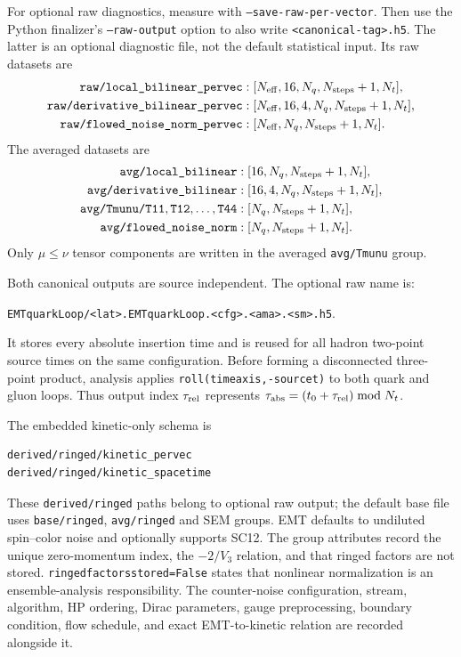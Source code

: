 \documentclass[11pt,a4paper]{article}
\newcommand{\code}[1]{\texttt{\begingroup\def\_{\textunderscore\allowbreak}#1\endgroup}}
\newcommand{\Vthree}{V_3}
\begin{document}
For optional raw diagnostics, measure with \code{--save-raw-per-vector}.
Then use the Python finalizer's \code{--raw-output} option to also write
\code{<canonical-tag>.h5}.
The latter is an optional diagnostic file, not the default statistical input.
Its raw datasets are
\begin{align}
  \code{raw/local\_bilinear\_pervec}
  &:
  [N_{\mathrm{eff}},16,N_q,N_{\mathrm{steps}}+1,N_t],
  \\
  \code{raw/derivative\_bilinear\_pervec}
  &:
  [N_{\mathrm{eff}},16,4,N_q,N_{\mathrm{steps}}+1,N_t],
  \\
  \code{raw/flowed\_noise\_norm\_pervec}
  &:
  [N_{\mathrm{eff}},N_q,N_{\mathrm{steps}}+1,N_t].
\end{align}
The averaged datasets are
\begin{align}
  \code{avg/local\_bilinear}
  &:[16,N_q,N_{\mathrm{steps}}+1,N_t],
  \\
  \code{avg/derivative\_bilinear}
  &:[16,4,N_q,N_{\mathrm{steps}}+1,N_t],
  \\
  \code{avg/Tmunu/T11},\code{T12},\ldots,\code{T44}
  &:
  [N_q,N_{\mathrm{steps}}+1,N_t],
  \\
  \code{avg/flowed\_noise\_norm}
  &:
  [N_q,N_{\mathrm{steps}}+1,N_t].
\end{align}
Only \(\mu\leq\nu\) tensor components are written in the averaged
\code{avg/Tmunu} group.

Both canonical outputs are source independent. The optional raw name is:
\begin{center}
  \code{EMTquarkLoop/<lat>.EMTquarkLoop.<cfg>.<ama>.<sm>.h5}.
\end{center}
It stores every absolute insertion time and is reused for all hadron two-point
source times on the same configuration.
Before forming a disconnected three-point product, analysis applies
\code{roll(time\_axis,-source\_t)} to both quark and gluon loops.  Thus output
index \(\tau_{\rm rel}\) represents
\(\tau_{\rm abs}=(t_0+\tau_{\rm rel})\bmod N_t\).

The embedded kinetic-only schema is
\begin{verbatim}
derived/ringed/kinetic_pervec
derived/ringed/kinetic_spacetime
\end{verbatim}
These \code{derived/ringed} paths belong to optional raw output; the default
base file uses \code{base/ringed}, \code{avg/ringed} and SEM groups.
EMT defaults to undiluted spin--color noise and optionally supports SC12.
The group attributes record the unique zero-momentum index, the
\(-2/\Vthree\) relation, and that ringed factors are not stored.
\code{ringed\_factors\_stored=False} states that nonlinear normalization is an
ensemble-analysis responsibility.  The counter-noise configuration, stream, algorithm, HP
ordering, Dirac parameters, gauge preprocessing, boundary condition, flow
schedule, and exact EMT-to-kinetic relation are recorded alongside it.
\end{document}
